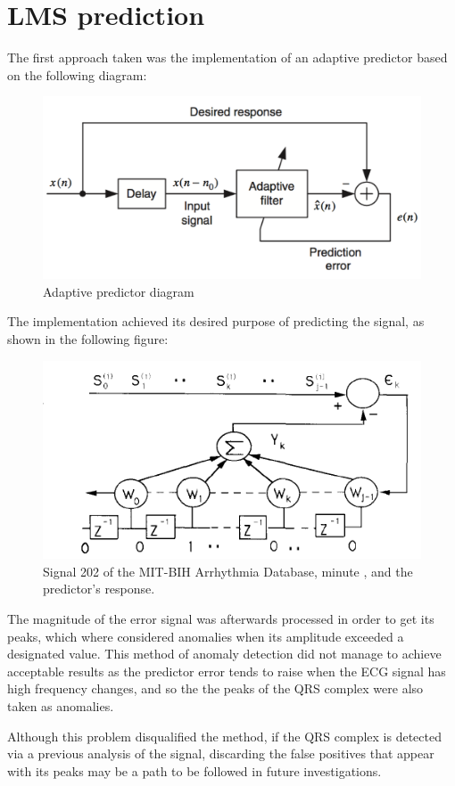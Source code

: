\documentclass[conference]{IEEEtran}
\begin{document}
\section{LMS prediction}

The first approach taken was the implementation of an adaptive predictor based on the following diagram:

\begin{figure}[H]
\centerline{\includegraphics[scale=0.4]{prediction.png}}
\caption{Adaptive predictor diagram}
\label{fig}
\end{figure}

The implementation achieved its desired purpose of predicting the signal, as shown in the following figure:

\begin{figure}[H]
\centerline{\includegraphics[scale=0.7]{ARF_diagram.png}}
\caption{Signal 202 of the MIT-BIH Arrhythmia Database, minute , and the predictor's response.}
\label{fig}
\end{figure}

The magnitude of the error signal was afterwards processed in order to get its peaks, which where considered anomalies when its amplitude exceeded a designated value. This method of anomaly detection did not manage to achieve acceptable results as the predictor error tends to raise when the ECG signal has high frequency changes, and so the the peaks of the QRS complex were also taken as anomalies. \par
Although this problem disqualified the method, if the QRS complex is detected via a previous analysis of the signal, discarding the false positives that appear with its peaks may be a path to be followed in future investigations.\par
\end{document}
